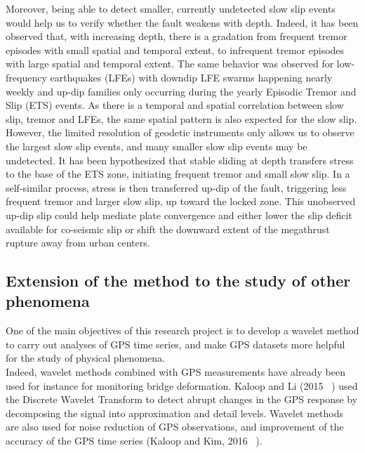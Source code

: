 \documentclass[main.tex]{subfiles}
\begin{document}
Moreover, being able to detect smaller, currently undetected slow slip events would help us to verify whether the fault weakens with depth. Indeed, it has been observed that, with increasing depth, there is a gradation from frequent tremor episodes with small spatial and temporal extent, to infrequent tremor episodes with large spatial and temporal extent. The same behavior was observed for low-frequency earthquakes (LFEs) with downdip LFE swarms happening nearly weekly and up-dip families only occurring during the yearly Episodic Tremor and Slip (ETS) events. As there is a temporal and spatial correlation between slow slip, tremor and LFEs, the same spatial pattern is also expected for the slow slip. However, the limited resolution of geodetic instruments only allows us to observe the largest slow slip events, and many smaller slow slip events may be undetected. It has been hypothesized that stable sliding at depth transfers stress to the base of the ETS zone, initiating frequent tremor and small slow slip. In a self-similar process, stress is then transferred up-dip of the fault, triggering less frequent tremor and larger slow slip, up toward the locked zone. This unobserved up-dip slip could help mediate plate convergence and either lower the slip deficit available for co-seismic slip or shift the downward extent of the megathrust rupture away from urban centers. \\

\subsection{Extension of the method to the study of other phenomena}

One of the main objectives of this research project is to develop a wavelet method to carry out analyses of GPS time series, and make GPS datasets more helpful for the study of physical phenomena. \\

Indeed, wavelet methods combined with GPS measurements have already been used for instance for monitoring bridge deformation. Kaloop and Li (2015 ~\cite{KAL_2011}) used the Discrete Wavelet Transform to detect abrupt changes in the GPS response by decomposing the signal into approximation and detail levels. Wavelet methods are also used for noise reduction of GPS observations, and improvement of the accuracy of the GPS time series (Kaloop and Kim, 2016 ~\cite{KAL_2016}). \\
\end{document}
